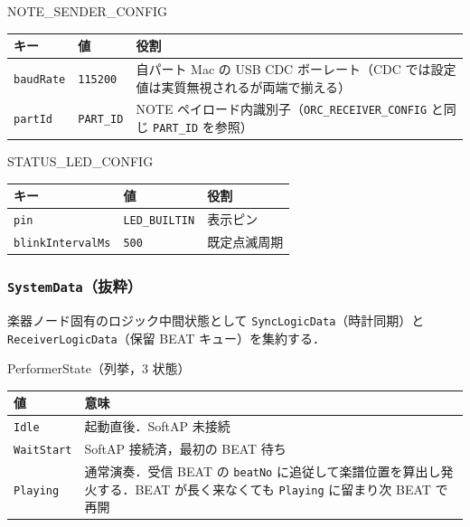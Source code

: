 \documentclass[lualatex,book,paper=a4paper,jafontsize=11.5pt,jafontscale=1.05]{jlreq}
\begin{document}
\begin{apibox}{NOTE\_SENDER\_CONFIG}
\begin{tabular}{l l p{}}
\toprule
\textbf{キー} & \textbf{値} & \textbf{役割} \\
\midrule
\texttt{baudRate} & \texttt{115200} & 自パート Mac の USB CDC ボーレート（CDC では設定値は実質無視されるが両端で揃える） \\
\texttt{partId}   & \texttt{PART\_ID}   & NOTE ペイロード内識別子（\texttt{ORC\_RECEIVER\_CONFIG} と同じ \texttt{PART\_ID} を参照） \\
\bottomrule
\end{tabular}
\end{apibox}

\begin{apibox}{STATUS\_LED\_CONFIG}
\begin{tabular}{l l p{}}
\toprule
\textbf{キー} & \textbf{値} & \textbf{役割} \\
\midrule
\texttt{pin}             & \texttt{LED\_BUILTIN} & 表示ピン \\
\texttt{blinkIntervalMs} & \texttt{500}          & 既定点滅周期 \\
\bottomrule
\end{tabular}
\end{apibox}

\subsubsection{\texttt{SystemData}（抜粋）}

楽器ノード固有のロジック中間状態として \texttt{SyncLogicData}（時計同期）と
\texttt{ReceiverLogicData}（保留 BEAT キュー）を集約する．

\begin{apibox}{PerformerState（列挙，3 状態）}
\begin{tabular}{l p{}}
\toprule
\textbf{値} & \textbf{意味} \\
\midrule
\texttt{Idle}      & 起動直後．SoftAP 未接続 \\
\texttt{WaitStart} & SoftAP 接続済，最初の BEAT 待ち \\
\texttt{Playing}   & 通常演奏．受信 BEAT の \texttt{beatNo} に追従して楽譜位置を算出し発火する．BEAT が長く来なくても \texttt{Playing} に留まり次 BEAT で再開 \\
\bottomrule
\end{tabular}
\end{apibox}
\end{document}
